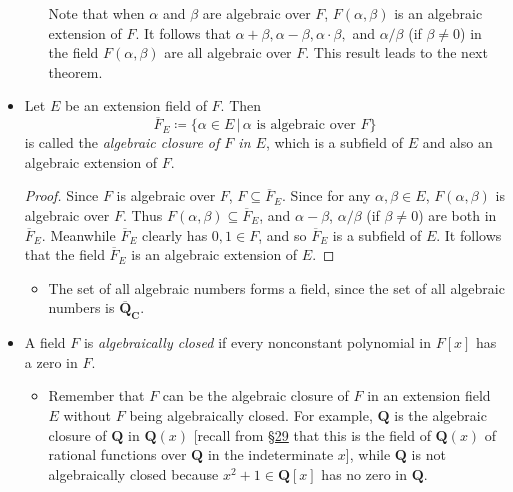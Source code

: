 \documentclass[11pt]{article}
\newcommand{\lk}[2]{\hyperlink{subsection.#1.#2}{\S#2}} %
\newcommand{\where}{\,|\,}
\newcommand{\Q}{\mathbf{Q}}
\newcommand{\C}{\mathbf{C}}
\newcommand{\df}[1]{\textit{\textsf{#1}}}
\newcommand{\clos}[1]{\overline{#1}}
\begin{document}
\begin{itemize}
\begin{itemize}
        Note that when $\alpha$ and $\beta$ are algebraic over $F$, $F(\alpha,\beta)$ is an algebraic extension of $F$. It follows that $\alpha + \beta, \alpha - \beta, \alpha \cdot \beta,$ and $\alpha/\beta$ (if $\beta \neq 0$) in the field $F(\alpha,\beta)$ are all algebraic over $F$. This result leads to the next theorem.
    \end{itemize}
    \item Let $E$ be an extension field of $F$. Then \[\clos{F}_E \coloneqq \{\alpha \in E \where \alpha \text{ is algebraic over } F\}\] is called the \df{algebraic closure of $F$ in $E$}, which is a subfield of $E$ and also an algebraic extension of $F$.
    \begin{proof}
        Since $F$ is algebraic over $F$, $F \subseteq \clos{F}_E$. Since for any $\alpha,\beta \in E$, $F(\alpha,\beta)$ is algebraic over $F$. Thus $F(\alpha,\beta) \subseteq \clos{F}_E$, and $\alpha - \beta$, $\alpha/\beta$ (if $\beta \neq 0$) are both in $\clos{F}_E$. Meanwhile $\clos{F}_E$ clearly has $0,1 \in F$, and so $\clos{F}_E$ is a subfield of $E$. It follows that the field $\clos{F}_E$ is an algebraic extension of $E$.
    \end{proof}
    \begin{itemize}
        \item The set of all algebraic numbers forms a field, since the set of all algebraic numbers is $\clos{\Q}_\C$.
    \end{itemize}
    \item A field $F$ is \df{algebraically closed} if every nonconstant polynomial in $F[x]$ has a zero in $F$.
    \begin{itemize}
        \item Remember that $F$ can be the algebraic closure of $F$ in an extension field $E$ without $F$ being algebraically closed. For example, $\Q$ is the algebraic closure of $\Q$ in $\Q(x)$ [recall from \lk{6}{29} that this is the field of $\Q(x)$ of rational functions over $\Q$ in the indeterminate $x$], while $\Q$ is not algebraically closed because $x^2 + 1 \in \Q[x]$ has no zero in $\Q$.


\end{itemize}
\end{itemize}
\end{document}
